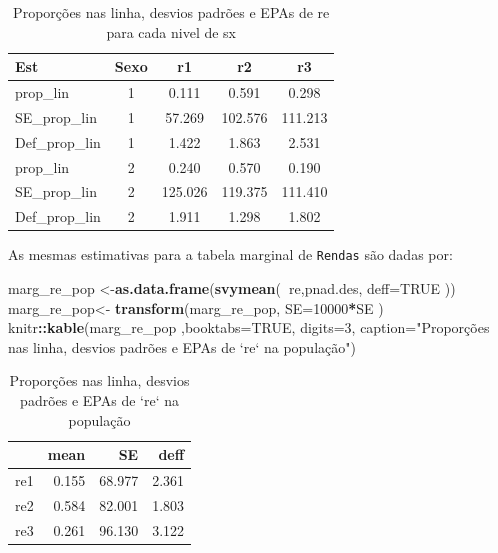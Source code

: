 \documentclass[]{book}
\newenvironment{Shaded}{\begin{snugshade}}{\end{snugshade}}
\newcommand{\KeywordTok}[1]{\textcolor[rgb]{0.13,0.29,0.53}{\textbf{#1}}}
\newcommand{\DataTypeTok}[1]{\textcolor[rgb]{0.13,0.29,0.53}{#1}}
\newcommand{\DecValTok}[1]{\textcolor[rgb]{0.00,0.00,0.81}{#1}}
\newcommand{\StringTok}[1]{\textcolor[rgb]{0.31,0.60,0.02}{#1}}
\newcommand{\OtherTok}[1]{\textcolor[rgb]{0.56,0.35,0.01}{#1}}
\newcommand{\OperatorTok}[1]{\textcolor[rgb]{0.81,0.36,0.00}{\textbf{#1}}}
\newcommand{\NormalTok}[1]{#1}
\theoremstyle{definition}
\theoremstyle{definition}
\theoremstyle{definition}
\theoremstyle{remark}
\begin{document}
\begin{table}

\caption{\label{tab:proplinha}Proporções nas linha, desvios padrões e EPAs de re para cada nivel de sx}
\centering
\begin{tabular}[t]{lcccc}
\toprule
Est & Sexo & r1 & r2 & r3\\
\midrule
prop\_lin & 1 & 0.111 & 0.591 & 0.298\\
SE\_prop\_lin & 1 & 57.269 & 102.576 & 111.213\\
Def\_prop\_lin & 1 & 1.422 & 1.863 & 2.531\\
prop\_lin & 2 & 0.240 & 0.570 & 0.190\\
SE\_prop\_lin & 2 & 125.026 & 119.375 & 111.410\\
Def\_prop\_lin & 2 & 1.911 & 1.298 & 1.802\\
\bottomrule
\end{tabular}
\end{table}

As mesmas estimativas para a tabela marginal de \texttt{Rendas} são
dadas por:

\begin{Shaded}
\begin{Highlighting}[]
\NormalTok{marg_re_pop <-}\KeywordTok{as.data.frame}\NormalTok{(}\KeywordTok{svymean}\NormalTok{(}\OperatorTok{~}\NormalTok{re,pnad.des, }\DataTypeTok{deff=}\OtherTok{TRUE}\NormalTok{ ))}
\NormalTok{marg_re_pop<-}\StringTok{ }\KeywordTok{transform}\NormalTok{(marg_re_pop, }\DataTypeTok{SE=}\DecValTok{10000}\OperatorTok{*}\NormalTok{SE )}
\NormalTok{knitr}\OperatorTok{::}\KeywordTok{kable}\NormalTok{(marg_re_pop ,}\DataTypeTok{booktabs=}\OtherTok{TRUE}\NormalTok{, }\DataTypeTok{digits=}\DecValTok{3}\NormalTok{,}
  \DataTypeTok{caption=}\StringTok{"Proporções nas linha, desvios padrões e EPAs de `re` na população"}\NormalTok{)}
\end{Highlighting}
\end{Shaded}

\begin{table}

\caption{\label{tab:unnamed-chunk-1}Proporções nas linha, desvios padrões e EPAs de `re` na população}
\centering
\begin{tabular}[t]{lrrr}
\toprule
  & mean & SE & deff\\
\midrule
re1 & 0.155 & 68.977 & 2.361\\
re2 & 0.584 & 82.001 & 1.803\\
re3 & 0.261 & 96.130 & 3.122\\
\bottomrule
\end{tabular}
\end{table}
\end{document}
